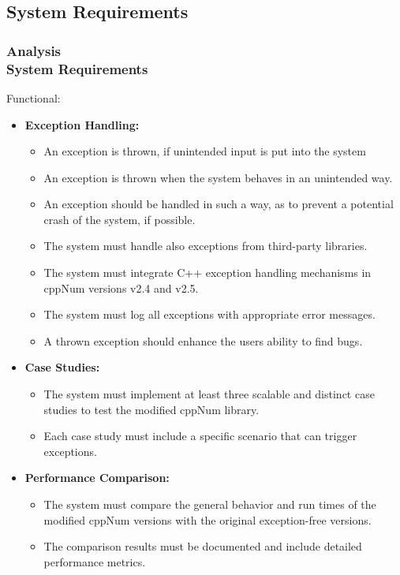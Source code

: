 \documentclass[ucs,10pt]{beamer}
\begin{document}
\subsection{System Requirements}

\begin{frame}
\frametitle{Analysis \\
	\small \color{rwth-blue} System Requirements}
	Functional:
	\begin{itemize}
		\item \textbf{Exception Handling:}
		\begin{itemize}
			\item An exception is thrown, if unintended input is put into the system
			\item An exception is thrown when the system behaves in an unintended way. 
                	\item An exception should be handled in such a way, as to prevent a potential crash of the system, if possible.
			\item The system must handle also exceptions from third-party libraries.
			\item The system must integrate C++ exception handling mechanisms in cppNum versions v2.4 and v2.5.
			\item The system must log all exceptions with appropriate error messages.
        	        \item A thrown exception should enhance the users ability to find bugs.
		\end{itemize}
		\item \textbf{Case Studies:}
		\begin{itemize}
			\item The system must implement at least three scalable and distinct case studies to test the modified cppNum library.
			\item Each case study must include a specific scenario that can trigger exceptions.
		\end{itemize}
		\item \textbf{Performance Comparison:}
		\begin{itemize}
			\item The system must compare the general behavior and run times of the modified cppNum versions with the original exception-free versions.
			\item The comparison results must be documented and include detailed performance metrics.
		\end{itemize}
	\end{itemize}
\end{frame}
\end{document}
